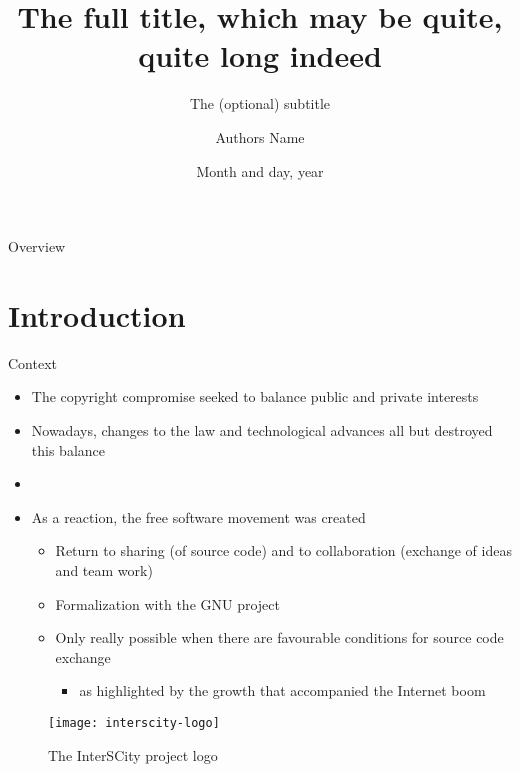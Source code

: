 \documentclass[
  xcolor={hyperref,svgnames,x11names,table},
  hyperref={pdfencoding=unicode,plainpages=false,pdfpagelabels=true,breaklinks=true},
  brazilian,english,12pt,aspectratio=149,
]{beamer}
\title[The shortened title]{The full title, which may be quite,\\ quite long indeed}
\subtitle{The (optional) subtitle}
\author[Authors Name]{Authors Name}
\institute[USP]{\textbf{Workshop Name} \\ Computer Science Department \\ IME USP}
\date{Month and day, year}
\begin{document}
\customtitlepage

\showqrcode

\begin{frame}{Overview}
  \overview
\end{frame}

\section{Introduction}

\begin{frame}{Context}
  \begin{itemize}
    \item The copyright compromise seeked to balance public and private interests
    \item Nowadays, changes to the law and technological advances all but destroyed this balance
    \item[]
    \item As a reaction, the free software movement was created
    \begin{itemize}
      \item Return to sharing (of source code) and to collaboration (exchange of ideas and team work)
      \item Formalization with the GNU project
      \item Only really possible when there are favourable conditions for source code exchange
      \begin{itemize}
        \item as highlighted by the growth that accompanied the Internet boom
      \end{itemize}
    \end{itemize}
  \end{itemize}

\end{frame}

\begin{frame}[plain]
  \begin{figure}[H] %
    \texttt{[image: interscity-logo]}
    \caption{The InterSCity project logo}
  \end{figure}
\end{frame}
\end{document}

